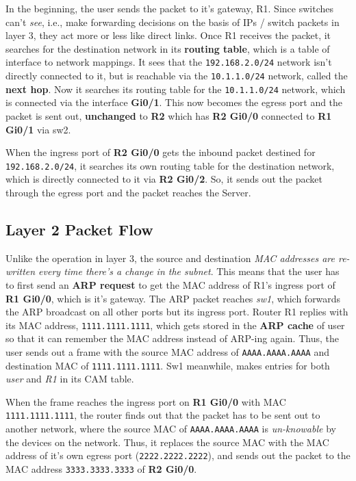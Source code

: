 In the beginning, the user sends the packet to it's gateway, R1. Since switches can't \textit{see}, i.e., make forwarding decisions on the basis of IPs / switch packets in layer 3, they act more or less like direct links. Once R1 receives the packet, it searches for the destination network in its \textbf{routing table}, which is a table of interface to network mappings. It sees that the \verb|192.168.2.0/24| network isn't directly connected to it, but is reachable via the \verb|10.1.1.0/24| network, called the \textbf{next hop}. Now it searches its routing table for the \verb|10.1.1.0/24| network, which is connected via the interface \textbf{Gi0/1}. This now becomes the egress port and the packet is sent out, \textbf{unchanged} to \textbf{R2} which has \textbf{R2 Gi0/0} connected to \textbf{R1 Gi0/1} via sw2. 

When the ingress port of \textbf{R2 Gi0/0} gets the inbound packet destined for \verb|192.168.2.0/24|, it searches its own routing table for the destination network, which is directly connected to it via \textbf{R2 Gi0/2}. So, it sends out the packet through the egress port and the packet reaches the Server. 

\subsection{Layer 2 Packet Flow}
Unlike the operation in layer 3, the source and destination \textit{MAC addresses are re-written every time there's a change in the subnet}. This means that the user has to first send an \textbf{ARP request} to get the MAC address of R1's ingress port of \textbf{R1 Gi0/0}, which is it's gateway. The ARP packet reaches \textit{sw1}, which forwards the ARP broadcast on all other ports but its ingress port. Router R1 replies with its MAC address, \verb|1111.1111.1111|, which gets stored in the \textbf{ARP cache} of user so that it can remember the MAC address instead of ARP-ing again. Thus, the user sends out a frame with the source MAC address of \verb|AAAA.AAAA.AAAA| and destination MAC of \verb|1111.1111.1111|. Sw1 meanwhile, makes entries for both \textit{user} and \textit{R1} in its CAM table. 

When the frame reaches the ingress port on \textbf{R1 Gi0/0} with MAC \verb|1111.1111.1111|, the router finds out that the packet has to be sent out to another network, where the source MAC of \verb|AAAA.AAAA.AAAA| is \textit{un-knowable} by the devices on the network. Thus, it replaces the source MAC with the MAC address of it's own egress port (\verb|2222.2222.2222|), and sends out the packet to the MAC address \verb|3333.3333.3333| of \textbf{R2 Gi0/0}. 

